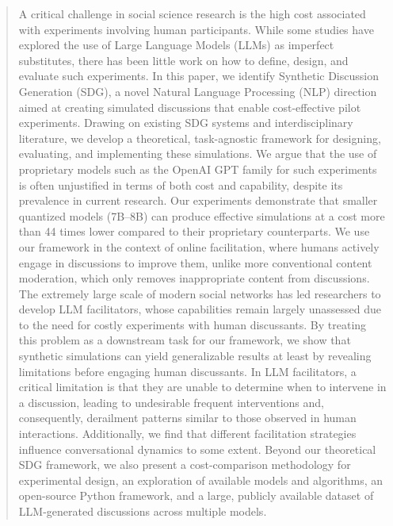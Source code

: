 %

\begin{abstract}
	
	A critical challenge in social science research is the high cost associated with experiments involving human participants. While some studies have explored the use of Large Language Models (LLMs) as imperfect substitutes, there has been little work on how to define, design, and evaluate such experiments. In this paper, we identify Synthetic Discussion Generation (SDG), a novel Natural Language Processing (NLP) direction aimed at creating simulated discussions that enable cost-effective pilot experiments. Drawing on existing SDG systems and interdisciplinary literature, we develop a theoretical, task-agnostic framework for designing, evaluating, and implementing these simulations. We argue that the use of proprietary models such as the OpenAI GPT family for such experiments is often unjustified in terms of both cost and capability, despite its prevalence in current research. Our experiments demonstrate that smaller quantized models (7B–8B) can produce effective simulations at a cost more than 44 times lower compared to their proprietary counterparts. We use our framework in the context of online facilitation, where humans actively engage in discussions to improve them, unlike more conventional content moderation, which only removes inappropriate content from discussions. The extremely large scale of modern social networks has led researchers to develop LLM facilitators, whose capabilities remain largely unassessed due to the need for costly experiments with human discussants. By treating this problem as a downstream task for our framework, we show that synthetic simulations can yield generalizable results at least by revealing limitations before engaging human discussants. In LLM facilitators, a critical limitation is that they are unable to determine when to intervene in a discussion, leading to undesirable frequent interventions and, consequently, derailment patterns similar to those observed in human interactions. Additionally, we find that different facilitation strategies influence conversational dynamics to some extent. Beyond our theoretical SDG framework, we also present a cost-comparison methodology for experimental design, an exploration of available models and algorithms, an open-source Python framework, and a large, publicly available dataset of LLM-generated discussions across multiple models. 
\end{abstract}